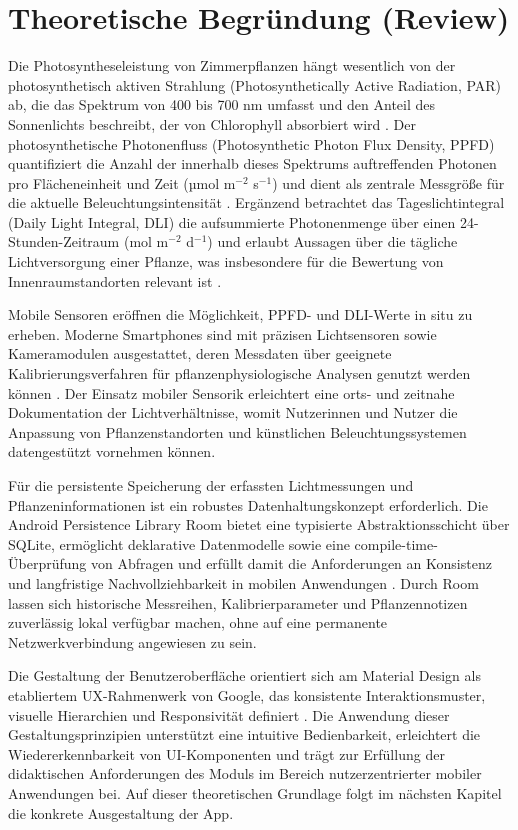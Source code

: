 \documentclass[14pt,a4paper]{report}
\begin{document}
\chapter{Theoretische Begründung (Review)}

Die Photosyntheseleistung von Zimmerpflanzen hängt wesentlich von der photosynthetisch aktiven Strahlung (Photosynthetically Active Radiation, PAR) ab, die das Spektrum von 400 bis 700 nm umfasst und den Anteil des Sonnenlichts beschreibt, der von Chlorophyll absorbiert wird \cite{McCree1972}. Der photosynthetische Photonenfluss (Photosynthetic Photon Flux Density, PPFD) quantifiziert die Anzahl der innerhalb dieses Spektrums auftreffenden Photonen pro Flächeneinheit und Zeit (µmol m$^{-2}$ s$^{-1}$) und dient als zentrale Messgröße für die aktuelle Beleuchtungsintensität \cite{NelsonBugbee2015}. Ergänzend betrachtet das Tageslichtintegral (Daily Light Integral, DLI) die aufsummierte Photonenmenge über einen 24-Stunden-Zeitraum (mol m$^{-2}$ d$^{-1}$) und erlaubt Aussagen über die tägliche Lichtversorgung einer Pflanze, was insbesondere für die Bewertung von Innenraumstandorten relevant ist \cite{FaustLogan2018}.

Mobile Sensoren eröffnen die Möglichkeit, PPFD- und DLI-Werte in situ zu erheben. Moderne Smartphones sind mit präzisen Lichtsensoren sowie Kameramodulen ausgestattet, deren Messdaten über geeignete Kalibrierungsverfahren für pflanzenphysiologische Analysen genutzt werden können \cite{Petersen2021}. Der Einsatz mobiler Sensorik erleichtert eine orts- und zeitnahe Dokumentation der Lichtverhältnisse, womit Nutzerinnen und Nutzer die Anpassung von Pflanzenstandorten und künstlichen Beleuchtungssystemen datengestützt vornehmen können.

Für die persistente Speicherung der erfassten Lichtmessungen und Pflanzeninformationen ist ein robustes Datenhaltungskonzept erforderlich. Die Android Persistence Library Room bietet eine typisierte Abstraktionsschicht über SQLite, ermöglicht deklarative Datenmodelle sowie eine compile-time-Überprüfung von Abfragen und erfüllt damit die Anforderungen an Konsistenz und langfristige Nachvollziehbarkeit in mobilen Anwendungen \cite{AndroidRoom}. Durch Room lassen sich historische Messreihen, Kalibrierparameter und Pflanzennotizen zuverlässig lokal verfügbar machen, ohne auf eine permanente Netzwerkverbindung angewiesen zu sein.

Die Gestaltung der Benutzeroberfläche orientiert sich am Material Design als etabliertem UX-Rahmenwerk von Google, das konsistente Interaktionsmuster, visuelle Hierarchien und Responsivität definiert \cite{MaterialDesign}. Die Anwendung dieser Gestaltungsprinzipien unterstützt eine intuitive Bedienbarkeit, erleichtert die Wiedererkennbarkeit von UI-Komponenten und trägt zur Erfüllung der didaktischen Anforderungen des Moduls im Bereich nutzerzentrierter mobiler Anwendungen bei. Auf dieser theoretischen Grundlage folgt im nächsten Kapitel die konkrete Ausgestaltung der App.
\end{document}
